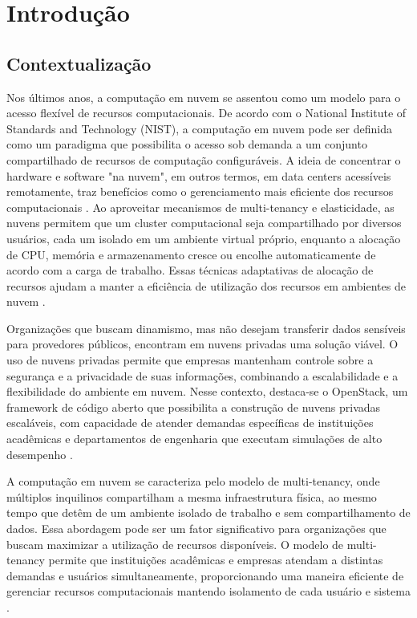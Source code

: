 \chapter{Introdução}


\section{Contextualização}

Nos últimos anos, a computação em nuvem se assentou como um modelo para o acesso flexível de recursos computacionais. De acordo com o National Institute of Standards and Technology (NIST), a computação em nuvem pode ser definida como um paradigma que possibilita o acesso sob demanda a um conjunto compartilhado de recursos de computação configuráveis. A ideia de concentrar o hardware e software "na nuvem", em outros termos, em data centers acessíveis remotamente, traz benefícios como o gerenciamento mais eficiente dos recursos computacionais \cite{mell2011}. Ao aproveitar mecanismos de multi-tenancy e elasticidade, as nuvens permitem que um cluster computacional seja compartilhado por diversos usuários, cada um isolado em um ambiente virtual próprio, enquanto a alocação de CPU, memória e armazenamento cresce ou encolhe automaticamente de acordo com a carga de trabalho. Essas técnicas adaptativas de alocação de recursos ajudam a manter a eficiência de utilização dos recursos em ambientes de nuvem \cite{dai2015, ray2013}. 

Organizações que buscam dinamismo, mas não desejam transferir dados sensíveis para provedores públicos, encontram em nuvens privadas uma solução viável. O uso de nuvens privadas permite que empresas mantenham controle sobre a segurança e a privacidade de suas informações, combinando a escalabilidade e a flexibilidade do ambiente em nuvem. Nesse contexto, destaca-se o OpenStack, um framework de código aberto que possibilita a construção de nuvens privadas escaláveis, com capacidade de atender demandas específicas de instituições acadêmicas e departamentos de engenharia que executam simulações de alto desempenho \cite{heuchert2021}. 

A computação em nuvem se caracteriza pelo modelo de multi-tenancy, onde múltiplos inquilinos compartilham a mesma infraestrutura física, ao mesmo tempo que detêm de um ambiente isolado de trabalho e sem compartilhamento de dados. Essa abordagem pode ser um fator significativo para organizações que buscam maximizar a utilização de recursos disponíveis. O modelo de multi-tenancy permite que instituições acadêmicas e empresas atendam a distintas demandas e usuários simultaneamente, proporcionando uma maneira eficiente de gerenciar recursos computacionais mantendo isolamento de cada usuário e sistema \cite{heuchert2021}.

